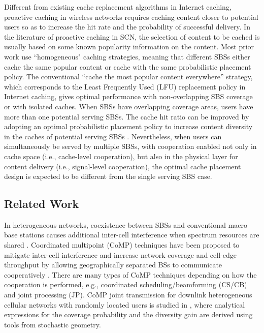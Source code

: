 \documentclass[twocolumns,10pt]{IEEEtran}
\begin{document}
Different from existing cache replacement algorithms in Internet caching, proactive caching in wireless networks requires caching content closer to potential users so as to increase the hit rate and the probability of successful delivery.  In the literature of proactive caching in SCN, the selection of content to be cached is usually based on some known popularity information on the content. Most prior work use ``homogeneous" caching strategies, meaning that different SBSs either cache the same popular content or cache with the same probabilistic placement policy. 
The conventional ``cache the most popular content everywhere'' strategy, which corresponds to the Least Frequently Used (LFU) replacement policy in Internet caching, gives optimal performance with non-overlapping SBS coverage or with isolated caches. When SBSs have overlapping coverage areas, users have more than one potential serving SBSs. The cache hit ratio can be improved by adopting an optimal probabilistic placement policy to increase content diversity in the caches of potential serving SBSs \cite{optimalcaching, random_caching}. Nevertheless, when users can simultaneously be served by multiple SBSs, with cooperation enabled not only in cache space (i.e., cache-level cooperation),  but also in the physical layer for content delivery (i.e., signal-level cooperation), the optimal cache placement design is expected to be different from the single serving SBS case.

\subsection{Related Work}
In heterogeneous networks, coexistence between SBSs and conventional macro base stations causes additional inter-cell interference when spectrum resources are shared \cite{optimization, interference_coordination}. Coordinated multipoint (CoMP) techniques have been proposed to mitigate inter-cell interference and increase network coverage and cell-edge throughput by allowing geographically separated BSs to communicate cooperatively \cite{comp}.  There are many types of CoMP techniques depending on how the cooperation is performed, e.g., coordinated scheduling/beamforming (CS/CB) and joint processing (JP). 
CoMP joint transmission for downlink heterogeneous cellular networks with randomly located users is studied in \cite{JC}, where analytical expressions for the coverage probability and the diversity gain are derived using tools from stochastic geometry. 
\end{document}
